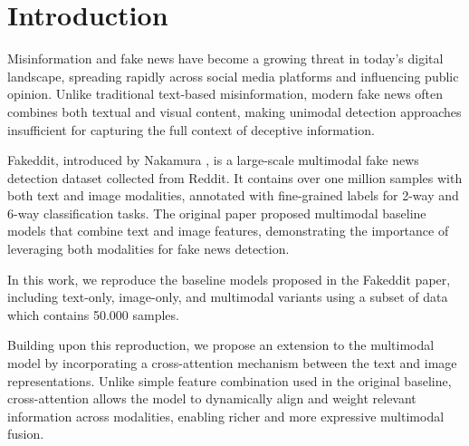 \section{Introduction}

Misinformation and fake news have become a growing threat in today's digital landscape, spreading rapidly across social media platforms and influencing public opinion. Unlike traditional text-based misinformation, modern fake news often combines both textual and visual content, making unimodal detection approaches insufficient for capturing the full context of deceptive information.

Fakeddit, introduced by Nakamura \cite{fakeddit}, is a large-scale multimodal fake news detection dataset collected from Reddit. It contains over one million samples with both text and image modalities, annotated with fine-grained labels for 2-way and 6-way classification tasks. The original paper proposed multimodal baseline models that combine text and image features, demonstrating the importance of leveraging both modalities for fake news detection.

In this work, we reproduce the baseline models proposed in the Fakeddit paper, including text-only, image-only, and multimodal variants using a subset of data which contains 50.000 samples.

Building upon this reproduction, we propose an extension to the multimodal model by incorporating a cross-attention mechanism \cite{attention} between the text and image representations. Unlike simple feature combination used in the original baseline, cross-attention allows the model to dynamically align and weight relevant information across modalities, enabling richer and more expressive multimodal fusion.